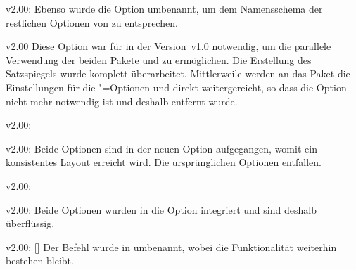 \begin{Obsolete}{v2.00:}{}
\printobsoletelist%
%
Ebenso wurde die Option  umbenannt, um dem Namensschema der 
restlichen Optionen von \TUDScript zu entsprechen.
\end{Obsolete}

\begin{Obsolete}{v2.00}{}{%
}
\printobsoletelist%
%
Diese Option war für \TUDScript in der Version~v1.0 notwendig, um die parallele 
Verwendung der beiden Pakete  und  zu 
ermöglichen. Die Erstellung des Satzspiegels wurde komplett überarbeitet. 
Mittlerweile werden an das Paket  die Einstellungen für die 
\KOMAScript"=Optionen  und  direkt 
weitergereicht, so dass die Option  nicht mehr notwendig ist 
und deshalb entfernt wurde.
\end{Obsolete}

\begin{Obsolete}{v2.00:}{%
}
\begin{Obsolete}{v2.00:}{%
}
\printobsoletelist%
%
Beide Optionen sind in der neuen Option  
aufgegangen, womit ein konsistentes Layout erreicht wird. Die ursprünglichen 
Optionen entfallen. 
\end{Obsolete}
\end{Obsolete}

\begin{Obsolete}{v2.00:}{}
\begin{Obsolete}{v2.00:}{}
\printobsoletelist%
%
Beide Optionen wurden in die Option  integriert und sind 
deshalb überflüssig.
\end{Obsolete}
\end{Obsolete}

\begin{Obsolete}{v2.00:}{%
  []%
}
\printobsoletelist%
%
Der Befehl  wurde in  umbenannt, wobei die 
Funktionalität weiterhin bestehen bleibt.
\end{Obsolete}

